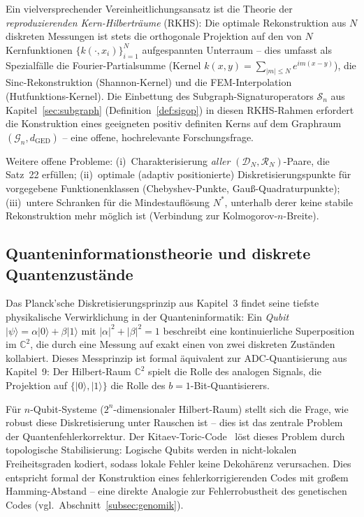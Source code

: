 ﻿\documentclass[a4paper,12pt]{article}
\theoremstyle{definition}
\begin{document}
Ein vielversprechender Vereinheitlichungsansatz ist die Theorie der
\emph{reproduzierenden Kern-Hilberträume} (RKHS): Die optimale Rekonstruktion aus $N$
diskreten Messungen ist stets die orthogonale Projektion auf den von $N$ Kernfunktionen
$\{k(\cdot, x_i)\}_{i=1}^N$ aufgespannten Unterraum -- dies umfasst als Spezialfälle die
Fourier-Partialsumme (Kernel $k(x,y) = \sum_{|m|\leq N} e^{im(x-y)}$), die
Sinc-Rekonstruktion (Shannon-Kernel) und die FEM-Interpolation (Hutfunktions-Kernel).
Die Einbettung des Subgraph-Signaturoperators $\mathcal{S}_n$ aus
Kapitel~\ref{sec:subgraph} (Definition~\ref{def:sigop}) in diesen RKHS-Rahmen erfordert
die Konstruktion eines geeigneten positiv definiten Kerns auf dem Graphraum
$(\mathcal{G}_n, d_{\mathrm{GED}})$ -- eine offene, hochrelevante Forschungsfrage.

Weitere offene Probleme: (i)~Charakterisierung \emph{aller} $(\mathcal{D}_N, \mathcal{R}_N)$-Paare, die
Satz~22 erfüllen; (ii)~optimale (adaptiv positionierte) Diskretisierungspunkte für
vorgegebene Funktionenklassen (Chebyshev-Punkte, Gauß-Quadraturpunkte); (iii)~untere
Schranken für die Mindestauflösung $N^*$, unterhalb derer keine stabile Rekonstruktion
mehr möglich ist (Verbindung zur Kolmogorov-$n$-Breite).

\subsection{Quanteninformationstheorie und diskrete Quantenzustände}

Das Planck'sche Diskretisierungsprinzip aus Kapitel~3 findet seine tiefste physikalische
Verwirklichung in der Quanteninformatik: Ein \emph{Qubit} $|\psi\rangle = \alpha|0\rangle + \beta|1\rangle$
mit $|\alpha|^2 + |\beta|^2 = 1$ beschreibt eine kontinuierliche Superposition im
$\mathbb{C}^2$, die durch eine Messung auf exakt einen von zwei diskreten Zuständen
kollabiert. Dieses Messprinzip ist formal äquivalent zur ADC-Quantisierung aus Kapitel~9:
Der Hilbert-Raum $\mathbb{C}^2$ spielt die Rolle des analogen Signals, die Projektion auf
$\{|0\rangle, |1\rangle\}$ die Rolle des $b=1$-Bit-Quantisierers.

Für $n$-Qubit-Systeme ($2^n$-dimensionaler Hilbert-Raum) stellt sich die Frage, wie
robust diese Diskretisierung unter Rauschen ist -- dies ist das zentrale Problem der
Quantenfehlerkorrektur. Der Kitaev-Toric-Code~\cite{kitaev2003} löst dieses Problem durch
topologische Stabilisierung: Logische Qubits werden in nicht-lokalen Freiheitsgraden
kodiert, sodass lokale Fehler keine Dekohärenz verursachen. Dies entspricht formal der
Konstruktion eines fehlerkorrigierenden Codes mit großem Hamming-Abstand -- eine direkte
Analogie zur Fehlerrobustheit des genetischen Codes (vgl.\ Abschnitt~\ref{subsec:genomik}).
\end{document}
